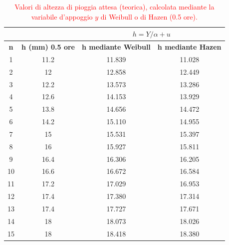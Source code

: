 \begin{table}[H] \centering
    \caption{\textcolor{red}{Valori di altezza di pioggia attesa (teorica), calcolata mediante la variabile d'appoggio $y$ di Weibull o di Hazen (0.5 ore).}}
    \begin{tabular}{cccc}
 & & \multicolumn{2}{c}{$h = Y/\alpha + u$}       \\
 \toprule
    \textbf{n} & \textbf{h (mm)     0.5 ore} & \textbf{h mediante Weibull} & \textbf{h mediante Hazen} \\
\midrule
    1          & 11.2                        & 11.839                & 11.028                 \\
    2          & 12                          & 12.858                & 12.449                 \\
    3          & 12.2                        & 13.573                & 13.286                 \\
    4          & 12.6                        & 14.153                & 13.929                 \\
    5          & 13.8                        & 14.656                & 14.472                 \\
    6          & 14.2                        & 15.110                & 14.955                 \\
    7          & 15                          & 15.531                & 15.397                 \\
    8          & 16                          & 15.927                & 15.811                 \\
    9          & 16.4                        & 16.306                & 16.205                 \\
    10         & 16.6                        & 16.672                & 16.584                 \\
    11         & 17.2                        & 17.029                & 16.953                 \\
    12         & 17.4                        & 17.380                & 17.314                 \\
    13         & 17.4                        & 17.727                & 17.671                 \\
    14         & 18                          & 18.073                & 18.026                 \\
    15         & 18                          & 18.418                & 18.380                 \\

\end{tabular}
\end{table}
